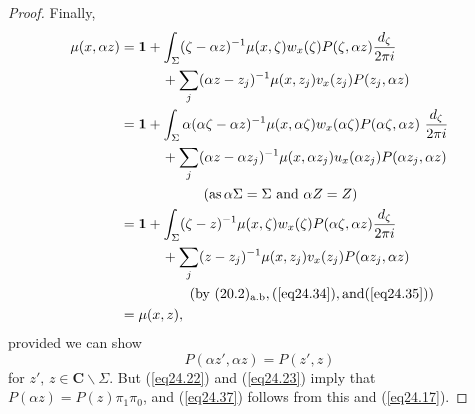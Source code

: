\documentclass{surv-l}
\theoremstyle{plain}
\theoremstyle{definition}
\numberwithin{equation}{chapter}
\begin{document}
\begin{proof}
Finally,
\begin{align*}
\mu(x, \alpha z)& =\mathbf{1}+\int_{\Sigma}(\zeta-\alpha z)^{-1}\mu(x, \zeta)w_{x}(\zeta)P(\zeta, \alpha z)\frac{d_{\zeta}}{2\pi i}\\
&\qquad\quad +\sum_{j}(\alpha z-z_{j})^{-1}\mu(x, z_{j})v_{x}(z_{j})P(z_{j}, \alpha z)\\
& =\mathbf{1}+\int_{\Sigma}\alpha(\alpha\zeta-\alpha z)^{-1}\mu(x, \alpha\zeta)w_{x}(\alpha\zeta)P(\alpha\zeta,\alpha z)\ \frac{d_{\zeta}}{2\pi i}\\
&\qquad\quad +\sum_{j}(\alpha z -\alpha z_{j})^{-1}\mu(x, \alpha z_{j})u_{x}(\alpha z_{j})P(\alpha z_{j},\alpha z)\\
& \qquad \qquad\qquad  (\mathrm{as} \, \alpha\Sigma=\Sigma\ \mathrm{and}\ \alpha Z=Z)\\
& =\mathbf{1}+\int_{\Sigma}(\zeta-z)^{-1}\mu(x, \zeta)w_{x}(\zeta)P(\alpha\zeta, \alpha z)\frac{d_{\zeta}}{2\pi i}\\
&\quad\quad\quad +\sum_{j}(z-z_{j})^{-1}\mu(x, z_{j})v_{x}(z_{j})P(\alpha z_{j}, \alpha z)\\
& \qquad \qquad\quad(\text{by }(20.2)_{\text{a.b}}, (\ref{eq24.34}), \mathrm{and} (\ref{eq24.35}))\\
& =\mu(x, z),
\end{align*}
provided we can show
\setcounter{equation}{36}
\begin{equation}\label{eq24.37}
P(\alpha z', \alpha z)=P(z', z)
\end{equation}
for $z',\,z\in \mathbf{C}\backslash \Sigma$. But (\ref{eq24.22}) and (\ref{eq24.23}) imply that $P(\alpha z)=P(z)\pi_{1}\pi_{0}$, and (\ref{eq24.37}) follows from this and (\ref{eq24.17}).
\end{proof}
\end{document}
